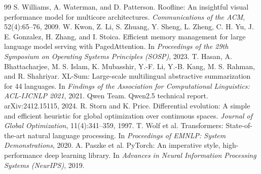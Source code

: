 \documentclass[11pt,a4paper]{article}
\begin{document}
\begin{thebibliography}{99}
 S. Williams, A. Waterman, and D. Patterson. Roofline: An insightful visual performance model for multicore architectures. \emph{Communications of the ACM}, 52(4):65--76, 2009.
 W. Kwon, Z. Li, S. Zhuang, Y. Sheng, L. Zheng, C. H. Yu, J. E. Gonzalez, H. Zhang, and I. Stoica. Efficient memory management for large language model serving with PagedAttention. In \emph{Proceedings of the 29th Symposium on Operating Systems Principles (SOSP)}, 2023.
 T. Hasan, A. Bhattacharjee, M. S. Islam, K. Mubasshir, Y.-F. Li, Y.-B. Kang, M. S. Rahman, and R. Shahriyar. XL-Sum: Large-scale multilingual abstractive summarization for 44 languages. In \emph{Findings of the Association for Computational Linguistics: ACL-IJCNLP 2021}, 2021.
 Qwen Team. Qwen2.5 technical report. arXiv:2412.15115, 2024.
 R. Storn and K. Price. Differential evolution: A simple and efficient heuristic for global optimization over continuous spaces. \emph{Journal of Global Optimization}, 11(4):341--359, 1997.
 T. Wolf et al. Transformers: State-of-the-art natural language processing. In \emph{Proceedings of EMNLP: System Demonstrations}, 2020.
 A. Paszke et al. PyTorch: An imperative style, high-performance deep learning library. In \emph{Advances in Neural Information Processing Systems (NeurIPS)}, 2019.
\end{thebibliography}
\clearpage
\appendix
\end{document}
